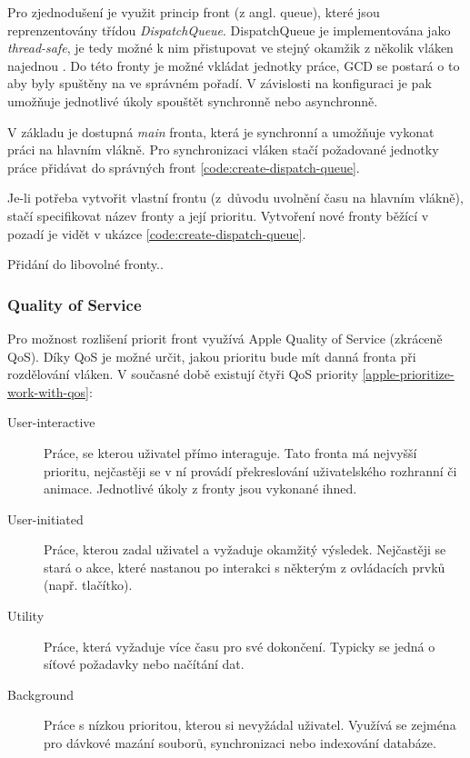 Pro zjednodušení je využit princip front (z angl. queue), které jsou reprenzentovány třídou \textit{DispatchQueue}.
DispatchQueue je implementována jako \textit{thread-safe}, je tedy možné k nim přistupovat ve stejný okamžik z několik vláken najednou \cite{apple-concurrency-programming-guide}.
Do této fronty je možné vkládat jednotky práce, GCD se postará o to aby byly spuštěny na ve správném pořadí.
V závislosti na konfiguraci je pak umožňuje jednotlivé úkoly spouštět synchronně nebo asynchronně.

V základu je dostupná \textit{main} fronta, která je synchronní a umožňuje vykonat práci na hlavním vlákně.
Pro synchronizaci vláken stačí požadované jednotky práce přidávat do správných front  \ref{code:create-dispatch-queue}.

Je-li potřeba vytvořit vlastní frontu (z důvodu uvolnění času na hlavním vlákně), stačí specifikovat název fronty a její prioritu.
Vytvoření nové fronty běžící v pozadí je vidět v ukázce \ref{code:create-dispatch-queue}.


Přidání do libovolné fronty..

\subsubsection{Quality of Service}

Pro možnost rozlišení priorit front využívá Apple Quality of Service (zkráceně QoS).
Díky QoS je možné určit, jakou prioritu bude mít danná fronta při rozdělování vláken.
V současné době existují čtyři QoS priority \ref{apple-prioritize-work-with-qos}:

\begin{description}
  \item[User-interactive] Práce, se kterou uživatel přímo interaguje.
  Tato fronta má nejvyšší prioritu, nejčastěji se v ní provádí překreslování uživatelského rozhranní či animace.
  Jednotlivé úkoly z fronty jsou vykonané ihned.
  \item[User-initiated] Práce, kterou zadal uživatel a vyžaduje okamžitý výsledek.
  Nejčastěji se stará o akce, které nastanou po interakci s některým z ovládacích prvků (např. tlačítko).
  \item[Utility] Práce, která vyžaduje více času pro své dokončení.
  Typicky se jedná o síťové požadavky nebo načítání dat.
  \item[Background] Práce s nízkou prioritou, kterou si nevyžádal uživatel.
  Využívá se zejména pro dávkové mazání souborů, synchronizaci nebo indexování databáze.
\end{description}

